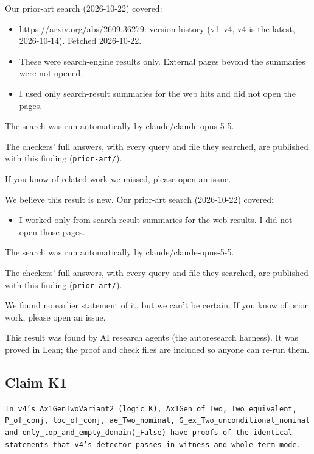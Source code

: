 \documentclass{article}
\begin{document}
Our prior-art search (2026-10-22) covered:

\begin{itemize}
\item https://arxiv.org/abs/2609.36279: version history (v1--v4, v4 is the latest, 2026-10-14). Fetched 2026-10-22.
\item These were search-engine results only. External pages beyond the summaries were not opened.
\item I used only search-result summaries for the web hits and did not open the pages.
\end{itemize}

The search was run automatically by claude/claude-opus-5-5.

The checkers' full answers, with every query and file they searched, are published with this finding (\texttt{prior-art/}).

If you know of related work we missed, please open an issue.

We believe this result is new. Our prior-art search (2026-10-22) covered:

\begin{itemize}
\item I worked only from search-result summaries for the web results. I did not open those pages.
\end{itemize}

The search was run automatically by claude/claude-opus-5-5.

The checkers' full answers, with every query and file they searched, are published with this finding (\texttt{prior-art/}).

We found no earlier statement of it, but we can't be certain. If you know of prior work, please open an issue.

This result was found by AI research agents (the autoresearch harness). It was proved in Lean; the proof and check files are included so anyone can re-run them.

\subsection*{Claim K1}

\texttt{In v4's Ax1GenTwoVariant2 (logic K), Ax1Gen\_of\_Two, Two\_equivalent, P\_of\_conj, loc\_of\_conj, ae\_Two\_nominal, G\_ex\_Two\_unconditional\_nominal and only\_top\_and\_empty\_domain(\_False) have proofs of the identical statements that v4's detector passes in witness and whole-term mode.}
\end{document}
